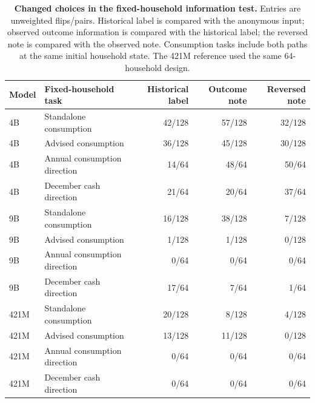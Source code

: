 \begin{table}[H]
\centering\footnotesize
\begin{tabularx}{\textwidth}{@{}lXrrr@{}}
\toprule
Model & Fixed-household task & Historical label & Outcome note & Reversed note\\
\midrule
4B & Standalone consumption & 42/128 & 57/128 & 32/128\\
4B & Advised consumption & 36/128 & 45/128 & 30/128\\
4B & Annual consumption direction & 14/64 & 48/64 & 50/64\\
4B & December cash direction & 21/64 & 20/64 & 37/64\\
\midrule
9B & Standalone consumption & 16/128 & 38/128 & 7/128\\
9B & Advised consumption & 1/128 & 1/128 & 0/128\\
9B & Annual consumption direction & 0/64 & 0/64 & 0/64\\
9B & December cash direction & 17/64 & 7/64 & 1/64\\
\midrule
421M & Standalone consumption & 20/128 & 8/128 & 4/128\\
421M & Advised consumption & 13/128 & 11/128 & 0/128\\
421M & Annual consumption direction & 0/64 & 0/64 & 0/64\\
421M & December cash direction & 0/64 & 0/64 & 0/64\\
\bottomrule
\end{tabularx}
\caption{\textbf{Changed choices in the fixed-household information test.} Entries are unweighted flips/pairs. Historical label is compared with the anonymous input; observed outcome information is compared with the historical label; the reversed note is compared with the observed note. Consumption tasks include both paths at the same initial household state. The 421M reference used the same 64-household design.}
\label{hh:tab:information}
\end{table}
